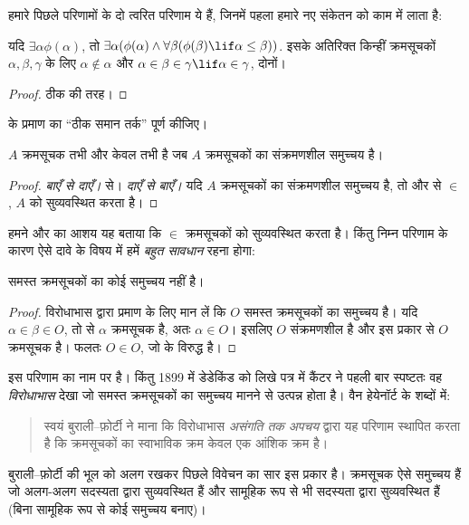 \documentclass[../../../include/open-logic-section]{subfiles}
\begin{document}
हमारे पिछले परिणामों के दो त्वरित परिणाम ये हैं, जिनमें पहला हमारे नए
संकेतन को काम में लाता है:

\begin{cor}
यदि $\exists \alpha\phi(\alpha)$, तो $\exists \alpha(\phi(\alpha)
\land \forall \beta(\phi(\beta) \lif \alpha \leq \beta))$.
इसके अतिरिक्त किन्हीं क्रमसूचकों $\alpha, \beta, \gamma$ के लिए
$\alpha \notin \alpha$ और
$\alpha \in \beta \in \gamma \lif \alpha \in \gamma$, दोनों।
\end{cor}

\begin{proof}
ठीक  की तरह।
\end{proof}

\begin{prob}
 के प्रमाण का ``ठीक समान तर्क''
पूर्ण कीजिए।
\end{prob}

\begin{cor}
$A$ क्रमसूचक तभी और केवल तभी है जब $A$ क्रमसूचकों का संक्रमणशील समुच्चय है।
\end{cor}

\begin{proof}
\emph{बाएँ से दाएँ।}  से। \emph{दाएँ से बाएँ।}
यदि $A$ क्रमसूचकों का संक्रमणशील समुच्चय है, तो
 और  से $\in$, $A$ को
सुव्यवस्थित करता है।
\end{proof}

हमने  और  का आशय यह बताया
कि $\in$ क्रमसूचकों को सुव्यवस्थित करता है। किंतु निम्न परिणाम के कारण ऐसे
दावे के विषय में हमें \emph{बहुत सावधान} रहना होगा:

\begin{thm}[बुराली--फ़ोर्टी विरोधाभास]
समस्त क्रमसूचकों का कोई समुच्चय नहीं है।
\end{thm}

\begin{proof}
विरोधाभास द्वारा प्रमाण के लिए मान लें कि $O$ समस्त क्रमसूचकों का समुच्चय
है। यदि $\alpha \in \beta \in O$, तो  से $\alpha$
क्रमसूचक है, अतः $\alpha \in O$। इसलिए $O$ संक्रमणशील है और इस प्रकार
 से $O$ क्रमसूचक है। फलतः $O \in O$, जो
 के विरुद्ध है।
\end{proof}
\noindent
इस परिणाम का नाम \citeauthor{Burali-Forti1897} पर है। किंतु 1899 में
डेडेकिंड को लिखे पत्र में कैंटर ने पहली बार स्पष्टतः वह \emph{विरोधाभास}
देखा जो समस्त क्रमसूचकों का समुच्चय मानने से उत्पन्न होता है। वैन हेयेनॉर्ट
के शब्दों में:
\begin{quote}
  स्वयं बुराली--फ़ोर्टी ने माना कि विरोधाभास \emph{असंगति तक अपचय} द्वारा
  यह परिणाम स्थापित करता है कि क्रमसूचकों का स्वाभाविक क्रम केवल एक आंशिक
  क्रम है।
  \citep[p.~105]{Heijenoort1967}
\end{quote}
बुराली--फ़ोर्टी की भूल को अलग रखकर पिछले विवेचन का सार इस प्रकार है।
क्रमसूचक ऐसे समुच्चय हैं जो अलग-अलग सदस्यता द्वारा सुव्यवस्थित हैं और सामूहिक
रूप से भी सदस्यता द्वारा सुव्यवस्थित हैं (बिना सामूहिक रूप से कोई समुच्चय
बनाए)।
\end{document}
